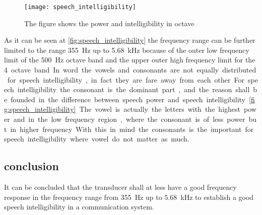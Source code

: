  \begin{figure}[H]
	\centering
		\texttt{[image: speech\_intelligibility]}
		\caption{The figure shows the power and intelligibility in octave  \citep{arl_us_army}}
		\label{fig:speech_intelligibility}
\end{figure}

As it can be seen at \autoref{fig:speech_intelligibility} the frequency range can be further limited to the range \SI{355}{\hertz} up to \SI{5.68}{\kilo\hertz} because of the outer low frequency limit of the \SI{500}{\hertz} octave band and the upper outer high frequency limit for the \SI{4} octave band. 

In word the vowels and consonants are not equally distributed for speech intelligibility, in fact they are fare away from each other. For speech intelligibility the consonant is the dominant part, and the reason shall be founded in the difference between speech power and speech intelligibility \autoref{fig:speech_intelligibility}. The vowel is actually the letters with the highest power and in the low frequency region, where the consonant is of less power but in higher frequency. With this in mind the consonants is the important for speech intelligibility where vowel do not matter as much.

\subsection{conclusion}
It can be concluded that the transducer shall at less have a good frequency response in the frequency range from \SI{355}{\hertz} up to \SI{5.68}{\kilo\hertz} to establish a good speech intelligibility in a communication system.

